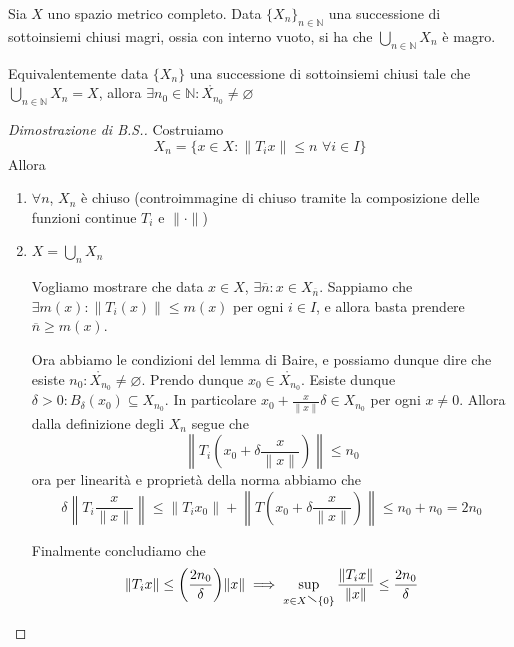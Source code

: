 \begin{lemmao}[Baire]
    Sia \(X\) uno spazio metrico completo. Data \(\{X_{n}\}_{n \in \mathbb{N}}\) una successione di sottoinsiemi chiusi magri, ossia con interno vuoto, si ha che \(
    \bigcup_{n \in \mathbb{N}} X_{n}\) è magro.

    Equivalentemente data \(\{X_{n}\} \) una successione di sottoinsiemi chiusi
    tale che \(\bigcup_{n \in \mathbb{N}} X_{n} = X\), allora \(\exists n_{0}
    \in \mathbb{N} : \mathring{X_{n_{0}}} \neq \varnothing\) 
\end{lemmao}
\begin{proof}[Dimostrazione di B.S.]
    Costruiamo 
    \[
      X_{n} = \{x \in X : \|T_{i}x\| \le n \,\, \forall i \in I\}
    \]
    Allora
\begin{enumerate}[label = \arabic*.]
    \item \(\forall n\), \(X_{n}\) è chiuso (controimmagine di chiuso tramite la
        composizione delle funzioni continue \(T_{i}\) e \(\|\cdot \|\))
    \item \(X = \bigcup_{n} X_{n}\)

        Vogliamo mostrare che data \(x \in X\), \(\exists \overline{n} : x \in X_{\overline{n}}\). Sappiamo che \(\exists m {(x)} : \|T_{i}{(x)}\| \le m {(x)}\) per ogni \(i \in I\), e allora basta prendere \(\overline{n} \ge m {(x)}\).

    Ora abbiamo le condizioni del lemma di Baire, e possiamo dunque dire che
    esiste \(n_{0} : \mathring{X_{n_{0}} } \neq \varnothing\). Prendo dunque \(x_{0} \in \mathring{X_{n_0}}\).
    Esiste dunque \(\delta > 0 : B_{\delta} {(x_{0})} \subseteq X_{n_0}\). In
    particolare \(x_{0} + \frac{x}{\|x\|}\delta \in X_{n_{0}} \) per ogni \(x \neq 0\). Allora dalla definizione degli \(X_{n}\) segue che
    \[
      \left\|T_{i} {\left(x_{0} + \delta \frac{x}{\|x\|}\right)}\right\| \le n_{0}
    \]
    ora per linearità e proprietà della norma abbiamo che
    \[
      \delta \left\| T_{i} \frac{x}{\|x\|}\right\| \le \|T_{i} x_{0}\| + \left\|T {\left( x_{0} + \delta \frac{x}{\|x\|} \right)} \right\| \le n_{0} + n_{0} = 2n_{0}
    \]

    Finalmente concludiamo che
    \[
        \|T_{i}x\|\le {\left( \frac{2n_{0}}{\delta} \right)} \|x\| \implies \sup_{x \in X \sminus \{0\} } \frac{\|T_{i}x\|}{\|x\|} \le \frac{2n_{0}}{\delta}
    \]
\end{enumerate}

\end{proof}



